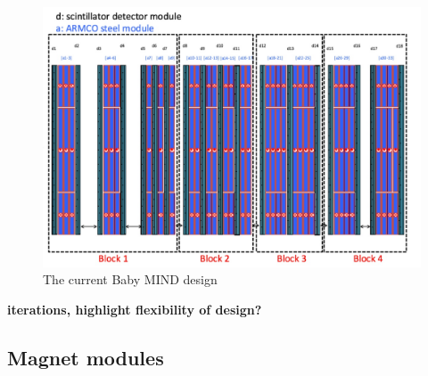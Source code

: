 \begin{figure}[h!]
\centering
\includegraphics[width=\textwidth]{figures/MINDschematic.jpeg}
\caption{The current Baby MIND design}
\label{fig:design}
\end{figure}

\textbf{iterations, highlight flexibility of design?}
\subsection{Magnet modules}

